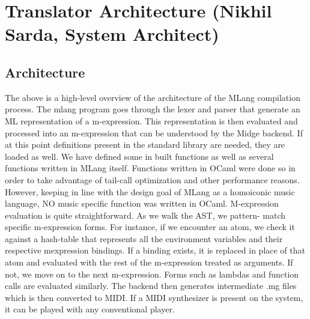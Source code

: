 \documentclass[letterpaper,11pt]{article}
\begin{document}
{\section{Translator Architecture (Nikhil Sarda, System Architect)}
\subsection{Architecture}

        \begin{figure}[H]
            \centering
        \end{figure}
The above is a high-level overview of the architecture of the MLang compilation process. The mlang program goes through the lexer and parser that
generate an ML representation of a m-expression. This representation is then evaluated and processed into an m-expression that can be understood
by the Midge backend. If at this point definitions present in the standard library are needed, they are loaded as well.
We have defined some in built functions as well as several functions written in MLang itself. Functions written in OCaml were done so in order to
take advantage of tail-call optimization and other performance reasons. However, keeping in line with the design goal of MLang as a homoiconic
music language, NO music specific function was written in OCaml. M-expression evaluation is quite straightforward. As we walk the AST, we pattern-
match specific m-expression forms. For instance, if we encounter an atom, we check it against a hash-table that represents all the environment
variables and their respective mexpression bindings. If a binding exists, it is replaced in place of that atom and evaluated with the rest of the
m-expression treated as arguments. If not, we move on to the next m-expression. Forms such as lambdas and function calls are evaluated similarly.
The backend then generates intermediate .mg files which is then converted to MIDI. If a MIDI synthesizer is present on the system, it can be played 
with any conventional player.

}
\end{document}
